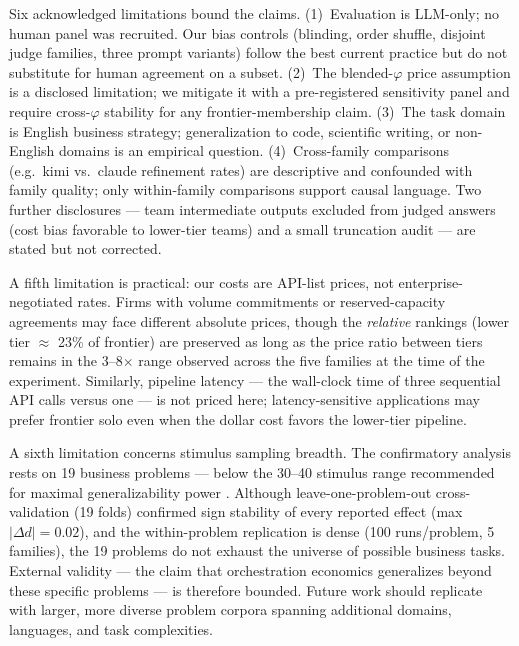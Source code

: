 \documentclass[12pt,a4paper]{article}
\newcommand{\phiBlend}{\varphi}
\begin{document}
Six acknowledged limitations bound the claims. (1)~Evaluation is LLM-only; no
human panel was recruited. Our bias controls (blinding, order shuffle, disjoint
judge families, three prompt variants) follow the best current practice
\citep{ZhengEtAl2023, VergaEtAl2024} but do not substitute for human agreement
on a subset. (2)~The blended-$\phiBlend$ price assumption is a disclosed
limitation; we mitigate it with a pre-registered sensitivity panel and require
cross-$\phiBlend$ stability for any frontier-membership claim. (3)~The task
domain is English business strategy; generalization to code, scientific writing,
or non-English domains is an empirical question. (4)~Cross-family comparisons
(e.g.\ kimi vs.\ claude refinement rates) are descriptive and confounded with
family quality; only within-family comparisons support causal language. Two
further disclosures --- team intermediate outputs excluded from judged answers
(cost bias favorable to lower-tier teams) and a small truncation audit --- are stated
but not corrected.

A fifth limitation is practical: our costs are API-list prices, not
enterprise-negotiated rates. Firms with volume commitments or reserved-capacity
agreements may face different absolute prices, though the \emph{relative}
rankings (lower tier $\approx$ 23\% of frontier) are preserved as long as the
price ratio between tiers remains in the 3--8$\times$ range observed across the
five families at the time of the experiment. Similarly, pipeline latency --- the
wall-clock time of three sequential API calls versus one --- is not priced here;
latency-sensitive applications may prefer frontier solo even when the dollar
cost favors the lower-tier pipeline.

A sixth limitation concerns stimulus sampling breadth. The confirmatory
analysis rests on 19 business problems --- below the 30--40 stimulus range
recommended for maximal generalizability power \citep{WestfallKennyJudd2014}.
Although leave-one-problem-out cross-validation (19 folds)
confirmed sign stability of every reported effect (max $|\Delta d| = 0.02$),
and the within-problem replication is dense (100 runs/problem, 5
families), the 19 problems do not exhaust the universe of possible
business tasks. External validity --- the claim that orchestration
economics generalizes beyond these specific problems --- is therefore
bounded. Future work should replicate with larger, more diverse problem
corpora spanning additional domains, languages, and task complexities.

\end{document}
